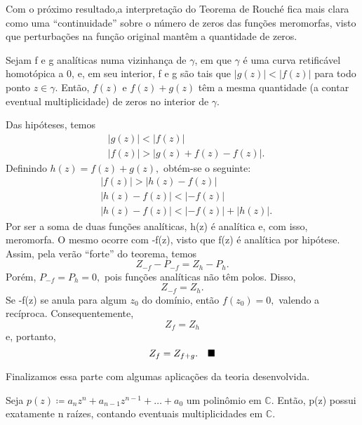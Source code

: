\documentclass[complex.tex]{subfiles}
\begin{document}
Com o próximo resultado,a interpretação do Teorema de Rouché fica mais clara como uma ``continuidade'' sobre o número de zeros das funções meromorfas,
visto que perturbações na função original mantêm a quantidade de zeros.
\begin{theorem*}
	Sejam f e g analíticas numa vizinhança de \(\gamma \), em que \(\gamma \) é uma curva retificável homotópica a 0, e, em seu interior,
	f e g são tais que \(|g(z)| < |f(z)|\) para todo ponto \(z\in \gamma .\) Então, \(f(z)\) e \(f(z) + g(z)\) têm a mesma quantidade (a contar eventual multiplicidade) de zeros no interior de \(\gamma \).
\end{theorem*}
\begin{proof*}
	Das hipóteses, temos
	\begin{align*}
		 & |g(z)| < |f(z)|                \\
		 & |f(z)| > |g(z) + f(z) - f(z)|.
	\end{align*}
	Definindo \(h(z) = f(z) + g(z),\) obtém-se o seguinte:
	\begin{align*}
		 & |f(z)| > |h(z) - f(z)|            \\
		 & |h(z) - f(z)| < |-f(z)|           \\
		 & |h(z) - f(z)| < |-f(z)| + |h(z)|.
	\end{align*}
	Por ser a soma de duas funções analíticas, h(z) é analítica e, com isso, meromorfa. O mesmo ocorre com -f(z), visto que f(z) é analítica por hipótese.
	Assim, pela verão ``forte'' do teorema, temos
	\[
		Z_{-f} - P_{-f} = Z_{h} - P_{h}.
	\]
	Porém, \(P_{-f} = P_{h} = 0,\) pois funções analíticas não têm polos. Disso,
	\[
		Z_{-f} = Z_{h}.
	\]
	Se -f(z) se anula para algum \(z_{0}\) do domínio, então \(f(z_{0}) = 0, \) valendo a recíproca. Consequentemente,
	\[
		Z_{f} = Z_{h}
	\]
	e, portanto,
	\[
		Z_{f} = Z_{f+g}.\quad \text{$\blacksquare$}
	\]
\end{proof*}
Finalizamos essa parte com algumas aplicações da teoria desenvolvida.
\hypertarget{fundamental-theorem-algebra}{\begin{theorem*}
		Seja \(p(z)\coloneqq a_{n}z^{n} + a_{n-1}z^{n-1} + \dotsc + a_{0}\) um polinômio em \(\mathbb{C}.\) Então, p(z) possui exatamente n raízes, contando
		eventuais multiplicidades em \(\mathbb{C}.\)
	\end{theorem*}}
\end{document}

